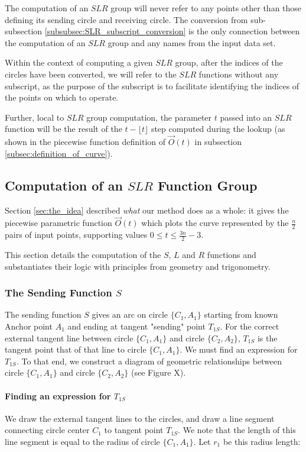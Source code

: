 \documentclass{article}
\begin{document}
The computation of an $SLR$ group will never refer to any points other than those defining its sending circle and receiving circle. The conversion from sub-subsection \ref{subsubsec:SLR_subscript_conversion} is the only connection between the computation of an $SLR$ group and any names from the input data set.

Within the context of computing a given $SLR$ group, after the indices of the circles have been converted, we will refer to the $SLR$ functions without any subscript, as the purpose of the subscript is to facilitate identifying the indices of the points on which to operate.

Further, local to $SLR$ group computation, the parameter $t$ passed into an $SLR$ function will be the result of the $t - \lfloor t \rfloor$ step computed during the lookup (as shown in the piecewise function definition of $\overrightarrow{O}(t)$ in subsection \ref{subsec:definition_of_curve}).

\subsection{Computation of an $SLR$ Function Group}
\label{subsec:SLR_group_computation}
Section \ref{sec:the_idea} described \textit{what} our method does as a whole: it gives the piecewise parametric function $\overrightarrow{O}(t)$ which plots the curve represented by the $\frac{n}{2}$ pairs of input points, supporting values $0 \leq t \leq \frac{3n}{2}-3$.

This section details the computation of the $S$, $L$ and $R$ functions and substantiates their logic with principles from geometry and trigonometry.

\subsubsection{The Sending Function $S$}
\label{subsubsec:sending_function_S}
The sending function $S$ gives an arc on circle $\{C_1, A_1\}$ starting from known Anchor point $A_1$ and ending at tangent "sending" point $T_{1S}$. For the correct external tangent line between circle $\{C_1, A_1\}$ and circle $\{C_2, A_2\}$, $T_{1S}$ is the tangent point that of that line to circle $\{C_1, A_1\}$. We must find an expression for $T_{1S}$. To that end, we construct a diagram of geometric relationships between circle $\{C_1, A_1\}$ and circle $\{C_2, A_2\}$ (see Figure X).

\paragraph{Finding an expression for $T_{1S}$}
We draw the external tangent lines to the circles, and draw a line segment connecting circle center $C_1$ to tangent point $T_{1S}$. We note that the length of this line segment is equal to the radius of circle $\{C_1, A_1\}$. Let $r_1$ be this radius length:
\end{document}
